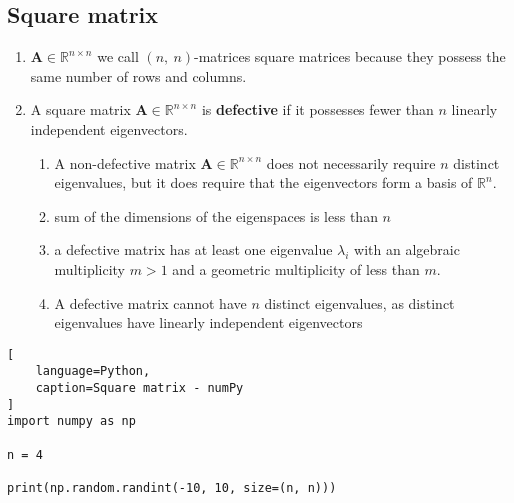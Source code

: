 \subsection{Square matrix}

\begin{enumerate}
    \item $\bm{A} \in \mathbb{R}^{n\times n}$ we call $(n,\ n)$-matrices square matrices because they possess the same number of rows and columns.
    \hfill \cite{mfml/book/mml/Deisenroth-Faisal-Ong}

    \item
    \begin{definition}
        A square matrix $\bm{A} \in \mathbb{R}^{n\times n}$ is \textbf{defective} if it possesses  fewer than $n$ linearly independent eigenvectors.
        \hfill \cite{mfml/book/mml/Deisenroth-Faisal-Ong}
    \end{definition}
    \begin{enumerate}
        \item A non-defective matrix $\bm{A} \in \mathbb{R}^{n\times n}$ does not necessarily require $n$ distinct eigenvalues, but it does require that the eigenvectors form a basis of $\mathbb{R}^n$.
        \hfill \cite{mfml/book/mml/Deisenroth-Faisal-Ong}

        \item sum of the dimensions of the eigenspaces is less than $n$
        \hfill \cite{mfml/book/mml/Deisenroth-Faisal-Ong}

        \item a defective matrix has at least one eigenvalue $\lambda_i$ with an algebraic multiplicity $m > 1$ and a geometric multiplicity of less than $m$.
        \hfill \cite{mfml/book/mml/Deisenroth-Faisal-Ong}

        \item A defective matrix cannot have $n$ distinct eigenvalues, as distinct eigenvalues have linearly independent eigenvectors
        \hfill \cite{mfml/book/mml/Deisenroth-Faisal-Ong}
    \end{enumerate}
\end{enumerate}


\begin{lstlisting}[
    language=Python,
    caption=Square matrix - numPy
]
import numpy as np

n = 4

print(np.random.randint(-10, 10, size=(n, n)))
\end{lstlisting}


